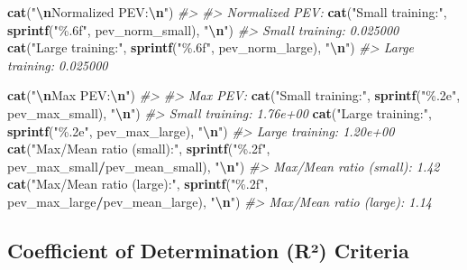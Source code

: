 \documentclass[
]{article}
\newenvironment{Shaded}{\begin{snugshade}}{\end{snugshade}}
\newcommand{\CommentTok}[1]{\textcolor[rgb]{0.56,0.35,0.01}{\textit{#1}}}
\newcommand{\FunctionTok}[1]{\textcolor[rgb]{0.13,0.29,0.53}{\textbf{#1}}}
\newcommand{\NormalTok}[1]{#1}
\newcommand{\SpecialCharTok}[1]{\textcolor[rgb]{0.81,0.36,0.00}{\textbf{#1}}}
\newcommand{\StringTok}[1]{\textcolor[rgb]{0.31,0.60,0.02}{#1}}
\begin{document}
\begin{Shaded}
\begin{Highlighting}[]
\FunctionTok{cat}\NormalTok{(}\StringTok{"}\SpecialCharTok{\textbackslash{}n}\StringTok{Normalized PEV:}\SpecialCharTok{\textbackslash{}n}\StringTok{"}\NormalTok{)}
\CommentTok{\#\textgreater{} }
\CommentTok{\#\textgreater{} Normalized PEV:}
\FunctionTok{cat}\NormalTok{(}\StringTok{"Small training:"}\NormalTok{, }\FunctionTok{sprintf}\NormalTok{(}\StringTok{"\%.6f"}\NormalTok{, pev\_norm\_small), }\StringTok{"}\SpecialCharTok{\textbackslash{}n}\StringTok{"}\NormalTok{)}
\CommentTok{\#\textgreater{} Small training: 0.025000}
\FunctionTok{cat}\NormalTok{(}\StringTok{"Large training:"}\NormalTok{, }\FunctionTok{sprintf}\NormalTok{(}\StringTok{"\%.6f"}\NormalTok{, pev\_norm\_large), }\StringTok{"}\SpecialCharTok{\textbackslash{}n}\StringTok{"}\NormalTok{)}
\CommentTok{\#\textgreater{} Large training: 0.025000}

\FunctionTok{cat}\NormalTok{(}\StringTok{"}\SpecialCharTok{\textbackslash{}n}\StringTok{Max PEV:}\SpecialCharTok{\textbackslash{}n}\StringTok{"}\NormalTok{)}
\CommentTok{\#\textgreater{} }
\CommentTok{\#\textgreater{} Max PEV:}
\FunctionTok{cat}\NormalTok{(}\StringTok{"Small training:"}\NormalTok{, }\FunctionTok{sprintf}\NormalTok{(}\StringTok{"\%.2e"}\NormalTok{, pev\_max\_small), }\StringTok{"}\SpecialCharTok{\textbackslash{}n}\StringTok{"}\NormalTok{)}
\CommentTok{\#\textgreater{} Small training: 1.76e+00}
\FunctionTok{cat}\NormalTok{(}\StringTok{"Large training:"}\NormalTok{, }\FunctionTok{sprintf}\NormalTok{(}\StringTok{"\%.2e"}\NormalTok{, pev\_max\_large), }\StringTok{"}\SpecialCharTok{\textbackslash{}n}\StringTok{"}\NormalTok{)}
\CommentTok{\#\textgreater{} Large training: 1.20e+00}
\FunctionTok{cat}\NormalTok{(}\StringTok{"Max/Mean ratio (small):"}\NormalTok{, }\FunctionTok{sprintf}\NormalTok{(}\StringTok{"\%.2f"}\NormalTok{, pev\_max\_small}\SpecialCharTok{/}\NormalTok{pev\_mean\_small), }\StringTok{"}\SpecialCharTok{\textbackslash{}n}\StringTok{"}\NormalTok{)}
\CommentTok{\#\textgreater{} Max/Mean ratio (small): 1.42}
\FunctionTok{cat}\NormalTok{(}\StringTok{"Max/Mean ratio (large):"}\NormalTok{, }\FunctionTok{sprintf}\NormalTok{(}\StringTok{"\%.2f"}\NormalTok{, pev\_max\_large}\SpecialCharTok{/}\NormalTok{pev\_mean\_large), }\StringTok{"}\SpecialCharTok{\textbackslash{}n}\StringTok{"}\NormalTok{)}
\CommentTok{\#\textgreater{} Max/Mean ratio (large): 1.14}
\end{Highlighting}
\end{Shaded}

\subsection{Coefficient of Determination (R²)
Criteria}\label{coefficient-of-determination-ruxb2-criteria}
\end{document}
